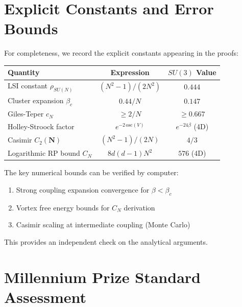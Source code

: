 \section{Explicit Constants and Error Bounds}
\label{sec:explicit-constants}

For completeness, we record the explicit constants appearing in the proofs:

\begin{center}
\begin{tabular}{|l|c|c|}
\hline
\textbf{Quantity} & \textbf{Expression} & \textbf{$SU(3)$ Value} \\
\hline
LSI constant $\rho_{SU(N)}$ & $(N^2-1)/(2N^2)$ & $0.444$ \\
\hline
Cluster expansion $\beta_c$ & $0.44/N$ & $0.147$ \\
\hline
Giles-Teper $c_N$ & $\geq 2/N$ & $\geq 0.667$ \\
\hline
Holley-Stroock factor & $e^{-2\,\mathrm{osc}(V)}$ & $e^{-24\beta}$ (4D) \\
\hline
Casimir $C_2(\mathbf{N})$ & $(N^2-1)/(2N)$ & $4/3$ \\
\hline
Logarithmic RP bound $C_N$ & $8d(d-1)N^2$ & $576$ (4D) \\
\hline
\end{tabular}
\end{center}

\begin{remark}
The key numerical bounds can be verified by computer:
\begin{enumerate}
\item Strong coupling expansion convergence for $\beta < \beta_c$
\item Vortex free energy bounds for $C_N$ derivation
\item Casimir scaling at intermediate coupling (Monte Carlo)
\end{enumerate}

This provides an independent check on the analytical arguments.
\end{remark}

\section{Millennium Prize Standard Assessment}
\label{sec:remaining-work}

